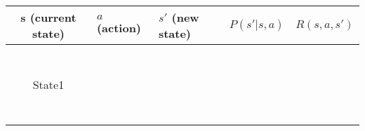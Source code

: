 \documentclass[12pt, letterpaper]{article}
\begin{document}
\begin{table}[]
    \begin{tabular}{|c|l|l|l|l|}
    \hline
    s (current state)        &$a$ (action) & $s'$ (new state) & $P(s'|s,a)$ & $R(s,a,s')$ \\ \hline
    \multirow{19}{*}{State1} &            &                &                 &                 \\ \cline{2-5} 
                             &            &                &                 &                 \\ \cline{2-5} 
                             &            &                &                 &                 \\ \cline{2-5} 
                             &            &                &                 &                 \\ \cline{2-5} 
                             &            &                &                 &                 \\ \cline{2-5} 
                             &            &                &                 &                 \\ \cline{2-5} 
                             &            &                &                 &                 \\ \cline{2-5} 
                             &            &                &                 &                 \\ \cline{2-5} 
                             &            &                &                 &                 \\ \cline{2-5} 
                             &            &                &                 &                 \\ \cline{2-5} 
                             &            &                &                 &                 \\ \cline{2-5} 
                             &            &                &                 &                 \\ \cline{2-5} 
                             &            &                &                 &                 \\ \cline{2-5} 
                             &            &                &                 &                 \\ \cline{2-5} 
                             &            &                &                 &                 \\ \cline{2-5} 
                             &            &                &                 &                 \\ \cline{2-5} 
                             &            &                &                 &                 \\ \cline{2-5} 
                             &            &                &                 &                 \\ \cline{2-5} 
                             &            &                &                 &                 \\ \hline
        \end{tabular}
\end{table}
\end{document}

